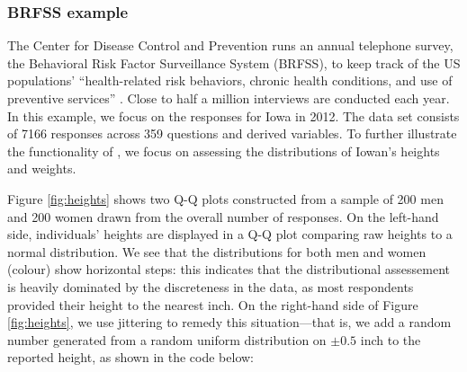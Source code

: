 \subsubsection{BRFSS example}\label{brfss-example}

\label{sec:brfss}

The Center for Disease Control and Prevention runs an annual telephone
survey, the Behavioral Risk Factor Surveillance System (BRFSS), to keep
track of the US populations' ``health-related risk behaviors, chronic
health conditions, and use of preventive services'' \citep{brfss}. Close
to half a million interviews are conducted each year. In this example,
we focus on the responses for Iowa in 2012. The data set consists of
7166 responses across 359 questions and derived variables. To further
illustrate the functionality of , we focus on assessing the
distributions of Iowan's heights and weights.

Figure \ref{fig:heights} shows two Q-Q plots constructed from a sample
of 200 men and 200 women drawn from the overall number of responses. On
the left-hand side, individuals' heights are displayed in a Q-Q plot
comparing raw heights to a normal distribution. We see that the
distributions for both men and women (colour) show horizontal steps:
this indicates that the distributional assessement is heavily dominated
by the discreteness in the data, as most respondents provided their
height to the nearest inch. On the right-hand side of Figure
\ref{fig:heights}, we use jittering to remedy this situation---that is,
we add a random number generated from a random uniform distribution on
\(\pm 0.5\) inch to the reported height, as shown in the code below:

